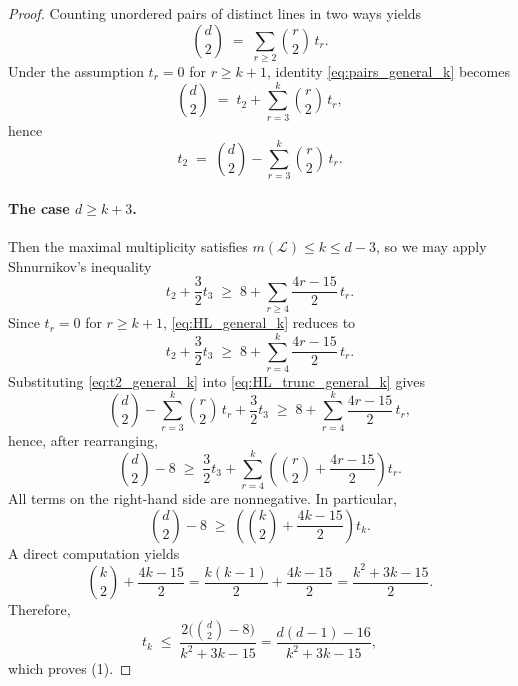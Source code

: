 \documentclass[11pt]{article}
\theoremstyle{plain}
\theoremstyle{definition}
\theoremstyle{remark}
\begin{document}
\begin{proof}
Counting unordered pairs of distinct lines in two ways yields
\begin{equation}\label{eq:pairs_general_k}
\binom{d}{2} \;=\; \sum_{r\ge 2}\binom{r}{2}\,t_r.
\end{equation}
Under the assumption $t_r=0$ for $r\ge k+1$, identity \eqref{eq:pairs_general_k} becomes
\begin{equation}\label{eq:pairs_trunc_general_k}
\binom{d}{2} \;=\; t_2 + \sum_{r=3}^{k}\binom{r}{2}\,t_r,
\end{equation}
hence
\begin{equation}\label{eq:t2_general_k}
t_2 \;=\; \binom{d}{2} - \sum_{r=3}^{k}\binom{r}{2}\,t_r.
\end{equation}

\medskip
\paragraph{The case $d\ge k+3$.}
Then the maximal multiplicity satisfies $m(\mathcal L)\le k\le d-3$, so we may apply Shnurnikov's inequality
\begin{equation}\label{eq:HL_general_k}
t_2 + \frac{3}{2}t_3 \;\ge\; 8 + \sum_{r\ge 4}\frac{4r-15}{2}\,t_r.
\end{equation}
Since $t_r=0$ for $r\ge k+1$, \eqref{eq:HL_general_k} reduces to
\begin{equation}\label{eq:HL_trunc_general_k}
t_2 + \frac{3}{2}t_3 \;\ge\; 8 + \sum_{r=4}^{k}\frac{4r-15}{2}\,t_r.
\end{equation}
Substituting \eqref{eq:t2_general_k} into \eqref{eq:HL_trunc_general_k} gives
\[
\binom{d}{2}
-
\sum_{r=3}^{k}\binom{r}{2}\,t_r
+
\frac{3}{2}t_3
\;\ge\;
8 + \sum_{r=4}^{k}\frac{4r-15}{2}\,t_r,
\]
hence, after rearranging,
\begin{equation}\label{eq:rearranged_general_k}
\binom{d}{2} - 8
\;\ge\;
\frac{3}{2}t_3
+
\sum_{r=4}^{k}
\left(
\binom{r}{2} + \frac{4r-15}{2}
\right)t_r.
\end{equation}
All terms on the right-hand side are nonnegative. In particular,
\[
\binom{d}{2} - 8
\;\ge\;
\left(
\binom{k}{2} + \frac{4k-15}{2}
\right)t_k.
\]
A direct computation yields
\[
\binom{k}{2} + \frac{4k-15}{2}
=
\frac{k(k-1)}{2} + \frac{4k-15}{2}
=
\frac{k^2+3k-15}{2}.
\]
Therefore,
\[
t_k
\;\le\;
\frac{2\bigl(\binom{d}{2}-8\bigr)}{k^2+3k-15}
=
\frac{d(d-1)-16}{k^2+3k-15},
\]
which proves (1).

\medskip

\end{proof}
\end{document}
